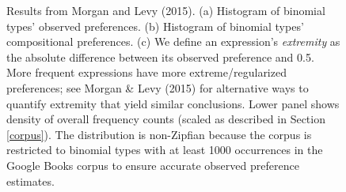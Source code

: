 \documentclass{evolang11}
\begin{document}
\begin{figure}[t]
\begin{center}
{	}

\end{center}
\caption{\footnotesize Results from Morgan and Levy (2015).  (a) Histogram of binomial types' observed preferences. (b) Histogram of binomial types' compositional preferences. (c) We define an expression's \emph{extremity} as the absolute difference between its observed preference and 0.5. More frequent expressions have more extreme/regularized preferences; see Morgan \& Levy (2015) for alternative ways to quantify extremity that yield similar conclusions. Lower panel shows density of overall frequency counts (scaled as described in Section \ref{corpus}). The distribution is non-Zipfian because the corpus is restricted to binomial types with at least 1000 occurrences in the Google Books corpus to ensure accurate observed preference estimates.}
\end{figure}
\end{document}
